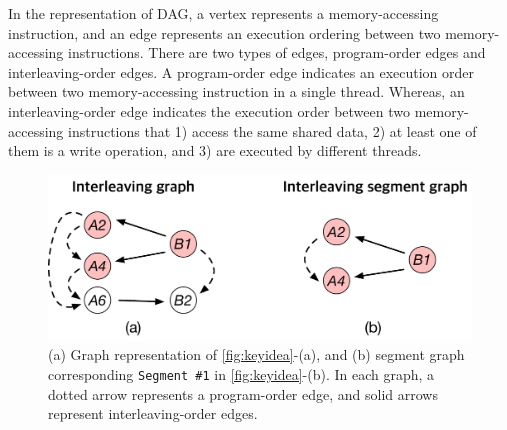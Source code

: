 %




In the representation of DAG,
%
a vertex represents a memory-accessing instruction, and an edge
represents an execution ordering between two memory-accessing
instructions. There are two types of edges,
program-order edges and interleaving-order edges.
%
A program-order edge indicates an execution order between two
memory-accessing instruction in a single thread.  Whereas, an
interleaving-order edge indicates the execution order between two
memory-accessing instructions that 1) access the same shared data, 2)
at least one of them is a write operation, and 3) are executed by
different threads.

\begin{figure}[t]
  \centering
  \includegraphics[width=0.8\linewidth]{fig/interleavingsegmentgraph.pdf}
  \caption{(a) Graph representation of \autoref{fig:keyidea}-(a), and
    (b) segment graph corresponding \texttt{Segment \#1} in
    \autoref{fig:keyidea}-(b). In each graph, a dotted arrow
    represents a program-order edge, and solid arrows represent
    interleaving-order edges.}
  \label{fig:interleavingsegmentgraph}
\end{figure}

%


